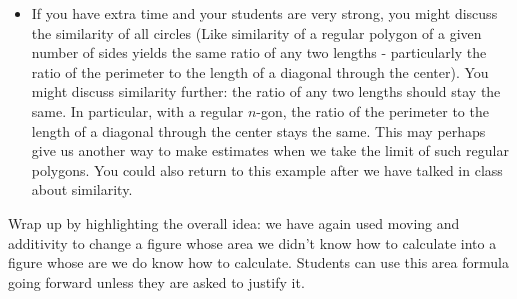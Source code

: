 \documentclass[nooutcomes,noauthor, handout]{ximera}
\begin{document}
\begin{instructorNotes}
\begin{itemize}
\item If you have extra time and your students are very strong, you might discuss the similarity of all circles (Like similarity of a regular polygon of a given number of sides yields the same ratio of any two lengths - particularly the ratio of the perimeter to the length of a diagonal through the center).  You might discuss similarity further: the ratio of any two lengths should stay the same.  In particular, with a regular $n$-gon, the ratio of the perimeter to the length of a diagonal through the center stays the same.  This may perhaps give us another way to make estimates when we take the limit of such regular polygons. You could also return to this example after we have talked in class about similarity.
\end{itemize}

Wrap up by highlighting the overall idea: we have again used moving and additivity to change a figure whose area we didn't know how to calculate into a figure whose are we do know how to calculate. Students can use this area formula going forward unless they are asked to justify it.



\end{instructorNotes}
\end{document}
